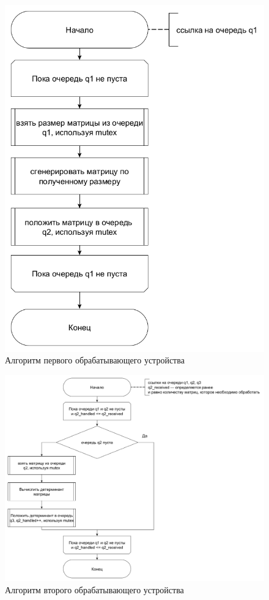 \begin{figure}[h]
	\centering
	\includegraphics[height=0.5\textheight]{img/q1.png}
	\caption{Алгоритм первого обрабатывающего устройства}
	\label{fig:q1}
\end{figure}
\begin{figure}[h]
	\centering
	\includegraphics[height=0.5\textheight]{img/q2.png}
	\caption{Алгоритм второго обрабатывающего устройства}
	\label{fig:q2}
\end{figure}
